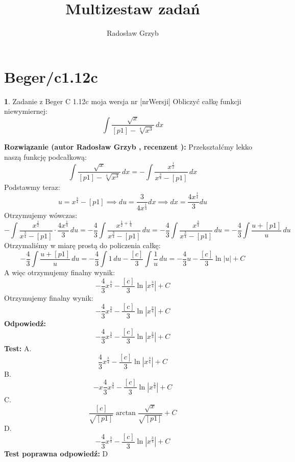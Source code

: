 \documentclass[12pt, a4paper]{article}
\title{Multizestaw zadań}
\author{Radosław Grzyb}
\date{}
\theoremstyle{definition} %
\newtheorem{zad}{}
\newcommand{\kategoria}[1]{\section{#1}} %
\newcommand{\zadStart}[1]{\begin{zad}#1\newline} %
\newcommand{\zadStop}{\end{zad}}   %
\newcommand{\rozwStart}[2]{\noindent \textbf{Rozwiązanie (autor #1 , recenzent #2): }\newline} %
\newcommand{\rozwStop}{\newline}                                            %
\newcommand{\odpStart}{\noindent \textbf{Odpowiedź:}\newline}    %
\newcommand{\odpStop}{\newline}                                             %
\newcommand{\testStart}{\noindent \textbf{Test:}\newline} %
\newcommand{\testStop}{\newline} %
\newcommand{\kluczStart}{\noindent \textbf{Test poprawna odpowiedź:}\newline} %
\newcommand{\kluczStop}{\newline} %
\begin{document}
\maketitle
\kategoria{Beger/c1.12c}
\zadStart{Zadanie z Beger C 1.12c moja wersja nr [nrWersji]}
Obliczyć całkę funkcji niewymiernej:
$$\int \frac{\sqrt{x}}{[p1]-\sqrt[4]{x^3}}\,dx$$
\zadStop
\rozwStart{Radosław Grzyb}{}
Przekształćmy lekko naszą funkcję podcałkową:
$$\int \frac{\sqrt{x}}{[p1]-\sqrt[4]{x^3}}\,dx=-\int \frac{x^{\frac{1}{2}}}{x^{\frac{3}{4}}-[p1]}\,dx$$
Podstawmy teraz:
$$u=x^{\frac{3}{4}}-[p1]\implies du=\frac{3}{4x^{\frac{1}{4}}}dx\implies dx=\frac{4x^{\frac{1}{4}}}{3}du$$
Otrzymujemy wówczas:
$$-\int \frac{x^{\frac{1}{2}}}{x^{\frac{3}{4}}-[p1]}\cdot\frac{4x^{\frac{1}{4}}}{3}\,du=-\frac{4}{3}\int \frac{x^{\frac{1}{2}+\frac{1}{4}}}{x^{\frac{3}{4}}-[p1]}\,du=-\frac{4}{3}\int \frac{x^{\frac{3}{4}}}{x^{\frac{3}{4}}-[p1]}\,du=-\frac{4}{3}\int \frac{u+[p1]}{u}\,du$$
Otrzymaliśmy w miarę prostą do policzenia całkę:
$$-\frac{4}{3}\int \frac{u+[p1]}{u}\,du=-\frac{4}{3}\int1\,du-\frac{[c]}{3}\int\frac{1}{u}\,du=-\frac{4}{3}u-\frac{[c]}{3}\ln|u|+C$$
A więc otrzymujemy finalny wynik:
$$-\frac{4}{3}x^{\frac{3}{4}}-\frac{[c]}{3}\ln|x^{\frac{3}{4}}|+C$$
Otrzymujemy finalny wynik:
$$-\frac{4}{3}x^{\frac{3}{4}}-\frac{[c]}{3}\ln|x^{\frac{3}{4}}|+C$$
\rozwStop
\odpStart
$$-\frac{4}{3}x^{\frac{3}{4}}-\frac{[c]}{3}\ln|x^{\frac{3}{4}}|+C$$
\odpStop
\testStart
A.$$\frac{4}{3}x^{\frac{3}{4}}-\frac{[c]}{3}\ln|x^{\frac{3}{4}}|+C$$
B.$$-x\frac{4}{3}x^{\frac{3}{4}}-\frac{[c]}{3}\ln|x^{\frac{3}{4}}|+C$$
C.$$\frac{[c]}{\sqrt{[p1]}}\arctan\frac{\sqrt{x}}{\sqrt{[p1]}}+C$$
D.$$-\frac{4}{3}x^{\frac{3}{4}}-\frac{[c]}{3}\ln|x^{\frac{3}{4}}|+C$$
\testStop
\kluczStart
D
\kluczStop
\end{document}
